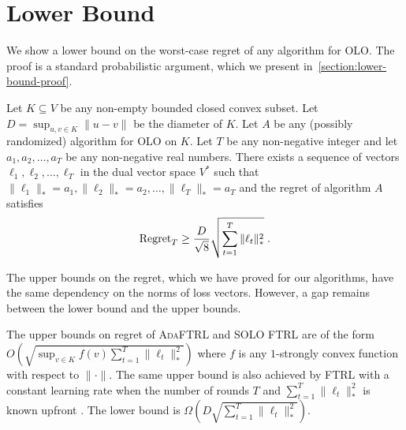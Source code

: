 \section{Lower Bound}
\label{section:lower-bound}

We show a lower bound on the worst-case regret of any algorithm for OLO. The
proof is a standard probabilistic argument, which we present
in~\ref{section:lower-bound-proof}.

\begin{theorem}
\label{theorem:simple-lower-bound}
Let $K \subseteq V$ be any non-empty bounded closed convex subset. Let $D =
\sup_{u,v \in K} \|u - v\|$ be the diameter of $K$. Let $A$ be any (possibly
randomized) algorithm for OLO on $K$. Let $T$ be any non-negative integer and
let $a_1, a_2, \dots, a_T$ be any non-negative real numbers.  There exists a
sequence of vectors $\ell_1, \ell_2, \dots, \ell_T$ in the dual vector space
$V^*$ such that $\|\ell_1\|_* = a_1, \|\ell_2\|_* = a_2, \dots, \|\ell_T\|_* =
a_T$ and the regret of algorithm $A$ satisfies
\begin{equation}
\label{equation:simple-lower-bound}
\operatorname{Regret}_T \ge \frac{D}{\sqrt{8}} \sqrt{\sum_{t=1}^T\|\ell_t\|_*^2} \; .
\end{equation}
\end{theorem}

The upper bounds on the regret, which we have proved for our algorithms, have
the same dependency on the norms of loss vectors.  However, a gap remains
between the lower bound and the upper bounds.

The upper bounds on regret of \textsc{AdaFTRL} and \textsc{SOLO FTRL} are of
the form $O(\sqrt{\sup_{v \in K} f(v) \sum_{t=1}^T \|\ell_t\|_*^2})$ where $f$
is any $1$-strongly convex function with respect to $\|\cdot\|$.  The same
upper bound is also achieved by \textsc{FTRL} with a constant learning rate
when the number of rounds $T$ and $\sum_{t=1}^T \|\ell_t\|_*^2$ is known
upfront \cite[Chapter 2]{Shalev-Shwartz-2011}.  The lower bound is
$\Omega(D\sqrt{\sum_{t=1}^T \|\ell_t\|_*^2})$.

